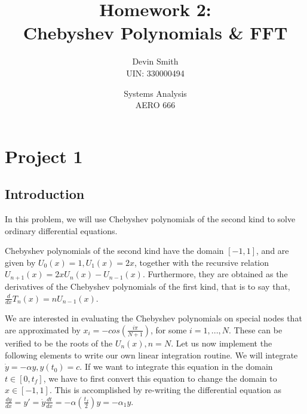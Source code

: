 \documentclass{article}
\title{Homework 2: \\ Chebyshev Polynomials \& FFT}
\author{Devin Smith \\ UIN: 330000494}
\date{Systems Analysis \\ AERO 666}
\begin{document}
\maketitle

\section{Project 1}
\subsection{Introduction}
In this problem, we will use Chebyshev polynomials of the second kind to solve ordinary differential equations. 
\par
Chebyshev polynomials of the second kind have the domain $[-1, 1]$, and are given by $U_0(x) = 1, U_1(x) = 2x$, together with the recursive relation $U_{n+1}(x)=2xU_n(x)-U_{n-1}(x)$. Furthermore, they are obtained as the derivatives of the Chebyshev polynomials of the first kind, that is to say that, $\frac{d}{dx}T_n(x)=nU_{n-1}(x)$.
\par
We are interested in evaluating the Chebyshev polynomials on special nodes that are approximated by $x_i=-cos(\frac{i\pi}{N+1})$, for some $i=1,...,N$. These can be verified to be the roots of the $U_n(x),n=N$. Let us now implement the following elements to write our own linear integration routine. We will integrate $\dot{y}=-\alpha y,y(t_0)=c$. If we want to integrate this equation
in the domain $t \in [0,t_f]$, we have to first convert this equation to change the domain to $x \in [-1, 1]$. This is accomplished by re-writing the differential equation as $\frac{dy}{dx}=y'=\dot{y}\frac{dt}{dx}=-\alpha(\frac{t_f}{2})y=-\alpha_1 y$.
\par
\end{document}
